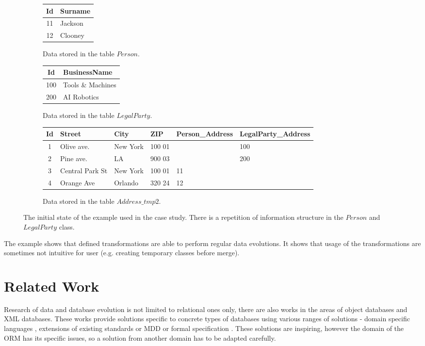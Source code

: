 \documentclass[runningheads]{comsis}
\begin{document}
\begin{figure}
\begin{subfigure}[b]{0.5\textwidth}
	\centering
	\begin{tabular}{| c | l |}
	 	\hline
		Id &  Surname \\ \hline  
		11 & Jackson  \\ \hline
		12 & Clooney  \\ \hline
	\end{tabular}
	\caption{Data stored in the table $Person$.}
\end{subfigure}
\begin{subfigure}[b]{0.5\textwidth}
	\centering
	\begin{tabular}{| c | l |}
	 	\hline
		Id &  BusinessName  \\ \hline  
		100 & Tools \& Machines  \\ \hline
		200 & AI Robotics \\ \hline
	\end{tabular}
	\caption{Data stored in the table $LegalParty$.}
\end{subfigure}
\begin{subfigure}[b]{\textwidth}
	\centering
	\begin{tabular}{| c | l | l | l | l | l |}
	 	\hline
		Id & Street & City & ZIP & Person\_Address & LegalParty\_Address\\ \hline  
		1 & Olive ave. & New York & 100 01 & & 100 \\ \hline
		2 & Pine ave. & LA & 900 03 & & 200  \\ \hline
		3 & Central Park St & New York & 100 01 & 11 &  \\ \hline
		4 & Orange Ave & Orlando & 320 24 & 12 &\\ \hline
	\end{tabular}
	\caption{Data stored in the table $Address\_tmp2$.}
\end{subfigure}
	\caption{The initial state of the example used in the case study. There is a repetition of information structure in the $Person$ and $LegalParty$ class.}
	\label{fig:case2}
\end{figure}

The example shows that defined transformations are able to perform regular data evolutions. It shows that usage of the transformations are sometimes not intuitive for user (e.g. creating temporary classes before merge).

\section{Related Work}
\label{sec:related-work}
Research of data and database evolution is not limited to relational ones only, there are also works in the areas of object databases and XML databases. These works provide solutions specific to concrete types of databases using various ranges of solutions - domain specific languages \cite{SERF}, extensions of existing standards or MDD \cite{Evolution_vs_Reorganization} or formal specification \cite{Tresch:1991vi}. These solutions are inspiring, however the domain of the ORM has its specific issues, so a solution from another domain has to be adapted carefully.
\end{document}
